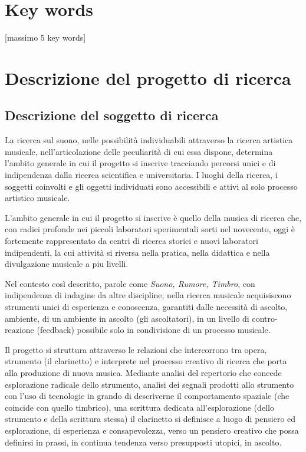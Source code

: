 \documentclass{gs-adonis}
\begin{document}
%
%


\section*{Key words}

[massimo 5 key words]


\section{Descrizione del progetto di ricerca}%

\subsection{Descrizione del soggetto di ricerca}%


La ricerca sul suono, nelle possibilità individuabili attraverso la ricerca
artistica musicale, nell'articolazione delle peculiarità di cui essa dispone,
determina l'ambito generale in cui il progetto si inscrive tracciando percorsi
unici e di indipendenza dalla ricerca scientifica e universitaria. I luoghi
della ricerca, i soggetti coinvolti e gli oggetti individuati sono accessibili
e attivi al solo processo artistico musicale.

L'ambito generale in cui il progetto si inscrive è quello della musica di
ricerca che, con radici profonde nei piccoli laboratori sperimentali sorti nel
novecento, oggi è fortemente rappresentato da centri di ricerca storici e
nuovi laboratori indipendenti, la cui attività si riversa nella pratica, nella
didattica e nella divulgazione musicale a piu livelli.

Nel contesto così descritto, parole come \emph{Suono, Rumore, Timbro},
con indipendenza di indagine da altre discipline, nella ricerca musicale
acquisiscono strumenti unici di esperienza e conoscenza, garantiti dalle
necessità di ascolto, ambiente, di un ambiente in ascolto (gli ascoltatori),
in un livello di contro-reazione (feedback) possibile solo in condivisione di un
processo musicale.

Il progetto si struttura attraverso le relazioni che intercorrono tra opera,
strumento (il clarinetto) e interprete nel processo creativo di ricerca che
porta alla produzione di nuova musica. Mediante analisi del repertorio che
concede esplorazione radicale dello strumento, analisi dei segnali prodotti
allo strumento con l'uso di tecnologie in grando di descriverne il
comportamento spaziale (che coincide con quello timbrico), una scrittura
dedicata all'esplorazione (dello strumento e della scrittura stessa) il clarinetto si definisce a luogo di pensiero ed esplorazione, di esperienza e
consapevolezza, verso un pensiero creativo che possa definirsi in prassi, in
continua tendenza verso presupposti utopici, in ascolto.
\end{document}
